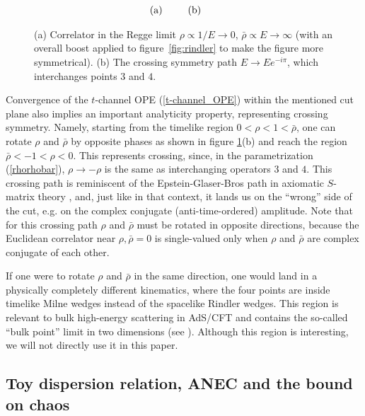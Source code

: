 \documentclass[11pt, reqno,preprint]{article}
\def\be{\begin{equation}}
\def\ee{\end{equation}}
\def\rhobar{\bar{\rho}}
\begin{document}
\begin{figure}
\be\begin{array}{cc}
\hspace{10mm}\def\svgwidth{80mm}
&
\hspace{5mm}\def\svgwidth{70mm}
\\
\\ \hspace{-11mm}\mbox{(a)}&\hspace{-6mm}\mbox{(b)}
\end{array}\nonumber\ee
\caption{(a) Correlator in the Regge limit $\rho\propto 1/E\to 0$, $\rhobar\propto E\to \infty$
(with an overall boost applied to figure~\ref{fig:rindler} to make the figure more symmetrical).
(b) The crossing symmetry path $E\to Ee^{-i\pi}$, which interchanges points $3$ and $4$.
}
\label{fig:regge}
\end{figure}

Convergence of the $t$-channel OPE
(\ref{t-channel_OPE}) within the mentioned cut plane also implies an important analyticity property,
representing crossing symmetry.
Namely, starting from the timelike region $0{<}\rho{<}1{<}\rhobar$, one can rotate $\rho$ and $\rhobar$ by opposite phases
as shown in figure \ref{fig:regge}(b) and reach the region $\rhobar{<}{-}1{<}\rho{<}0$. This represents crossing, since,
in the parametrization (\ref{rhorhobar}), $\rho \to -\rho$ is the same as interchanging operators $3$ and $4$.
This crossing path is reminiscent of the Epstein-Glaser-Bros path in axiomatic $S$-matrix theory \cite{Bros:1965kbd},
and, just like in that context, it lands us on the ``wrong'' side of the cut, e.g. on the complex conjugate (anti-time-ordered) amplitude.
Note that for this crossing path $\rho$ and $\rhobar$ must be rotated in opposite directions,
because the Euclidean correlator near $\rho,\rhobar=0$ is single-valued only when $\rho$ and $\rhobar$ are complex conjugate of each other.

If one were to rotate $\rho$ and $\rhobar$ in the same direction, one would land in a physically completely different
kinematics, where the four points are inside timelike Milne wedges instead of the spacelike Rindler wedges.
This region is relevant to bulk high-energy scattering in AdS/CFT and contains the so-called ``bulk point'' limit in two dimensions (see \cite{Heemskerk:2009pn,Maldacena:2015iua}).  Although this region is interesting, we will not directly use it in this paper.

\subsection{Toy dispersion relation, ANEC and the bound on chaos}
\label{ssec:toy disp}
\end{document}
